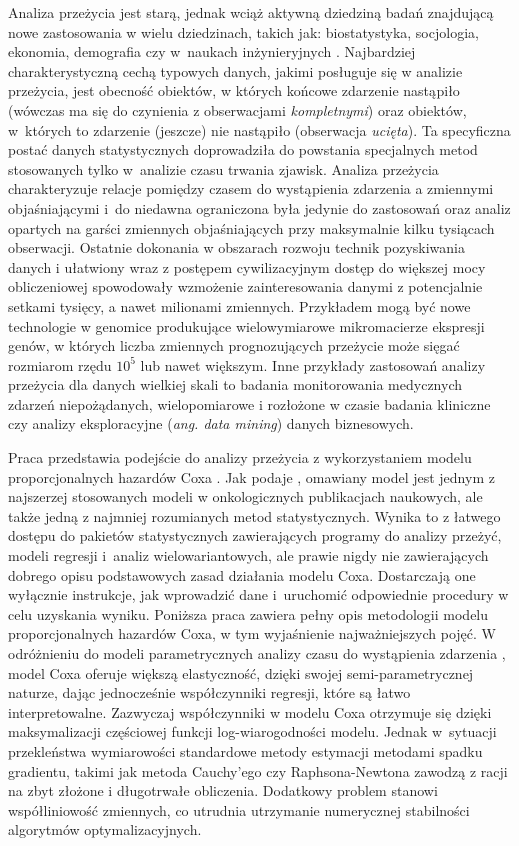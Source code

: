 Analiza przeżycia jest starą, jednak wciąż aktywną dziedziną badań znajdującą nowe zastosowania w wielu dziedzinach, takich jak: biostatystyka, socjologia, ekonomia, demografia czy w~naukach inżynieryjnych \citep{heckman, collett, boxst, hosmer}. Najbardziej charakterystyczną cechą typowych danych, jakimi posługuje się w analizie przeżycia, jest obecność obiektów, w których końcowe zdarzenie nastąpiło (wówczas ma się do czynienia z obserwacjami \textit{kompletnymi}) oraz obiektów, w~których to zdarzenie (jeszcze) nie nastąpiło (obserwacja \textit{ucięta}). Ta specyficzna postać danych statystycznych doprowadziła do powstania specjalnych metod stosowanych tylko w~analizie czasu trwania zjawisk. Analiza przeżycia charakteryzuje relacje pomiędzy czasem do wystąpienia zdarzenia a zmiennymi objaśniającymi \citep{kalf, oakes} i~do niedawna ograniczona była jedynie do zastosowań oraz analiz opartych na garści zmiennych objaśniających przy maksymalnie kilku tysiącach obserwacji. Ostatnie dokonania w obszarach rozwoju technik pozyskiwania danych i ułatwiony wraz z postępem cywilizacyjnym dostęp do większej mocy obliczeniowej spowodowały wzmożenie zainteresowania danymi z potencjalnie setkami tysięcy, a nawet milionami zmiennych. Przykładem mogą być nowe technologie w genomice produkujące wielowymiarowe mikromacierze ekspresji genów, w których liczba zmiennych prognozujących przeżycie może sięgać rozmiarom rzędu $10^5$ lub nawet większym. Inne przykłady zastosowań analizy przeżycia dla danych wielkiej skali to badania monitorowania medycznych zdarzeń niepożądanych, wielopomiarowe i rozłożone w czasie badania kliniczne czy analizy eksploracyjne (\textit{ang. data mining}) danych biznesowych.

Praca przedstawia podejście do analizy przeżycia z wykorzystaniem modelu proporcjonalnych hazardów Coxa \citep{cox}. Jak podaje \cite{assel}, omawiany model jest jednym z najszerzej stosowanych modeli w onkologicznych publikacjach naukowych, ale także jedną z najmniej rozumianych metod statystycznych. Wynika to z łatwego dostępu do pakietów statystycznych zawierających programy do analizy przeżyć, modeli regresji i~analiz wielowariantowych, ale prawie nigdy nie zawierających dobrego opisu podstawowych zasad działania modelu Coxa. Dostarczają one wyłącznie instrukcje, jak wprowadzić dane i~uruchomić odpowiednie procedury w celu uzyskania wyniku. Poniższa praca zawiera pełny opis metodologii modelu proporcjonalnych hazardów Coxa, w tym wyjaśnienie najważniejszych pojęć. W odróżnieniu do modeli parametrycznych analizy czasu do wystąpienia zdarzenia \citep{klein, collett, hosmer}, model Coxa oferuje większą elastyczność, dzięki swojej semi-parametrycznej naturze, dając jednocześnie  współczynniki regresji, które są łatwo interpretowalne. Zazwyczaj współczynniki w modelu Coxa otrzymuje się dzięki maksymalizacji częściowej funkcji log-wiarogodności modelu. Jednak w~sytuacji przekleństwa wymiarowości standardowe metody estymacji metodami spadku gradientu, takimi jak metoda Cauchy'ego czy Raphsona-Newtona zawodzą z racji na zbyt złożone i długotrwałe obliczenia. Dodatkowy problem stanowi współliniowość zmiennych, co utrudnia utrzymanie numerycznej stabilności algorytmów optymalizacyjnych.

